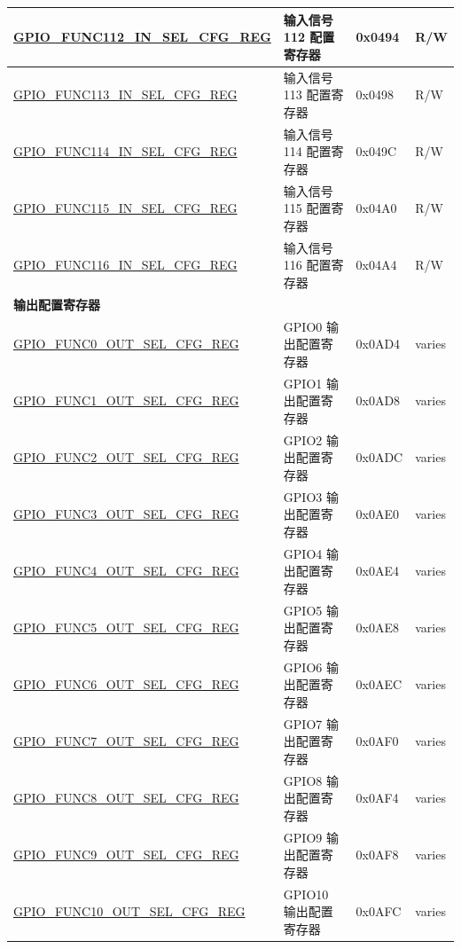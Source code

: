\begin{longtable}{ | p{6cm} | p{7.2cm} | p{1.3cm} | p{1cm} | }
\hyperref[regdesc:GPIOFUNCUINSELCFGREG]{GPIO\_FUNC112\_IN\_SEL\_CFG\_REG} & 输入信号 112 配置寄存器 & 0x0494 & R/W \\ \hline
\hyperref[regdesc:GPIOFUNCUINSELCFGREG]{GPIO\_FUNC113\_IN\_SEL\_CFG\_REG} & 输入信号 113 配置寄存器 & 0x0498 & R/W \\ \hline
\hyperref[regdesc:GPIOFUNCUINSELCFGREG]{GPIO\_FUNC114\_IN\_SEL\_CFG\_REG} & 输入信号 114 配置寄存器 & 0x049C & R/W \\ \hline
\hyperref[regdesc:GPIOFUNCUINSELCFGREG]{GPIO\_FUNC115\_IN\_SEL\_CFG\_REG} & 输入信号 115 配置寄存器 & 0x04A0 & R/W \\ \hline
\hyperref[regdesc:GPIOFUNCUINSELCFGREG]{GPIO\_FUNC116\_IN\_SEL\_CFG\_REG} & 输入信号 116 配置寄存器 & 0x04A4 & R/W \\ \hline
\multicolumn{4}{|l|}{\textbf{输出配置寄存器}} \\ \hline
\hyperref[regdesc:GPIOFUNCNOUTSELCFGREG]{GPIO\_FUNC0\_OUT\_SEL\_CFG\_REG} & GPIO0 输出配置寄存器 & 0x0AD4 & varies \\ \hline
\hyperref[regdesc:GPIOFUNCNOUTSELCFGREG]{GPIO\_FUNC1\_OUT\_SEL\_CFG\_REG} & GPIO1 输出配置寄存器 & 0x0AD8 & varies \\ \hline
\hyperref[regdesc:GPIOFUNCNOUTSELCFGREG]{GPIO\_FUNC2\_OUT\_SEL\_CFG\_REG} & GPIO2 输出配置寄存器 & 0x0ADC & varies \\ \hline
\hyperref[regdesc:GPIOFUNCNOUTSELCFGREG]{GPIO\_FUNC3\_OUT\_SEL\_CFG\_REG} & GPIO3 输出配置寄存器 & 0x0AE0 & varies \\ \hline
\hyperref[regdesc:GPIOFUNCNOUTSELCFGREG]{GPIO\_FUNC4\_OUT\_SEL\_CFG\_REG} & GPIO4 输出配置寄存器 & 0x0AE4 & varies \\ \hline
\hyperref[regdesc:GPIOFUNCNOUTSELCFGREG]{GPIO\_FUNC5\_OUT\_SEL\_CFG\_REG} & GPIO5 输出配置寄存器 & 0x0AE8 & varies \\ \hline
\hyperref[regdesc:GPIOFUNCNOUTSELCFGREG]{GPIO\_FUNC6\_OUT\_SEL\_CFG\_REG} & GPIO6 输出配置寄存器 & 0x0AEC & varies \\ \hline
\hyperref[regdesc:GPIOFUNCNOUTSELCFGREG]{GPIO\_FUNC7\_OUT\_SEL\_CFG\_REG} & GPIO7 输出配置寄存器 & 0x0AF0 & varies \\ \hline
\hyperref[regdesc:GPIOFUNCNOUTSELCFGREG]{GPIO\_FUNC8\_OUT\_SEL\_CFG\_REG} & GPIO8 输出配置寄存器 & 0x0AF4 & varies \\ \hline
\hyperref[regdesc:GPIOFUNCNOUTSELCFGREG]{GPIO\_FUNC9\_OUT\_SEL\_CFG\_REG} & GPIO9 输出配置寄存器 & 0x0AF8 & varies \\ \hline
\hyperref[regdesc:GPIOFUNCNOUTSELCFGREG]{GPIO\_FUNC10\_OUT\_SEL\_CFG\_REG} & GPIO10 输出配置寄存器 & 0x0AFC & varies \\ \hline

\end{longtable}

